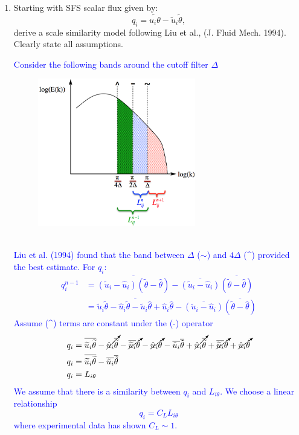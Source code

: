 \documentclass[11pt]{article}
\begin{document}
\begin{enumerate}
\item Starting with SFS scalar flux given by:
\begin{displaymath}
q_i=\widetilde{u_i\theta}-\widetilde{u}_i\widetilde{\theta},
\end{displaymath}
derive a scale similarity model following Liu et al., (J. Fluid Mech. 1994).  Clearly state all assumptions.\\
\textcolor{blue}{Consider the following bands around the cutoff filter $\Delta$
\begin{figure}[h]
\centering
\includegraphics[width=0.65\textwidth]{scalesimilarity}	
\end{figure}
~\\Liu et al. (1994) found that the band between $\Delta$ ($\sim$) and $4\Delta$ (\textasciicircum) provided the best estimate. For $q_i$:
\begin{align*}
q_i^{n-1} &= \overline{(\widetilde{u}_i  - \hat u_i)(\widetilde{\theta} - \hat \theta)} - \overline{(\widetilde{u}_i  - \hat u_i)}\overline{(\widetilde{\theta} - \hat \theta)}\\
&= \overline{\widetilde u_i \widetilde \theta - \hat u_i \widetilde \theta - \widetilde u_i \hat \theta + \hat u_i \hat \theta} - \overline{(\widetilde{u}_i  - \hat u_i)}\overline{(\widetilde{\theta} - \hat \theta)}
\end{align*}
Assume (\textasciicircum) terms are constant under the (-) operator
\begin{align*}
q_i &= \overline{ \widetilde u_i \widetilde \theta} - \cancelto{}{\hat u_i \overline{\widetilde \theta}} - \cancelto{}{\overline{\widetilde u_i} \hat \theta} - \cancelto{}{\hat u_i \hat \theta} - \overline{\tilde u_i}\overline{\tilde \theta} + \cancelto{}{\hat u_i \overline{\widetilde \theta}} + \cancelto{}{\overline{\widetilde u_i} \hat \theta} + \cancelto{}{\hat u_i \hat \theta}\\
q_i &= \overline{ \widetilde u_i \widetilde \theta} - \overline{\tilde u_i}\overline{\tilde \theta}\\
q_i &= L_{i\theta}
\end{align*}
We assume that there is a similarity between $q_i$ and $L_{i\theta}$. We choose a linear relationship
$$\boxed{q_i = C_L L_{i\theta}}$$
where experimental data has shown $C_L\sim 1$.
}


\end{enumerate}
\end{document}
